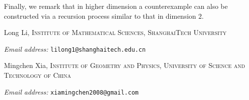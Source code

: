 \documentclass[11pt,a4paper]{article}
\begin{document}
Finally, we remark that in higher dimension a counterexample can also be constructed via a recursion process similar to that in dimension $2$. 


\printbibliography

Long Li, \textsc{Institute of Mathematical Sciences, ShanghaiTech University}\par\nopagebreak
  \textit{Email address:} \texttt{lilong1@shanghaitech.edu.cn}

Mingchen Xia, \textsc{Institute of Geometry and Physics, University of Science and Technology of China}\par\nopagebreak
  \textit{Email address:} \texttt{xiamingchen2008@gmail.com}
\end{document}
